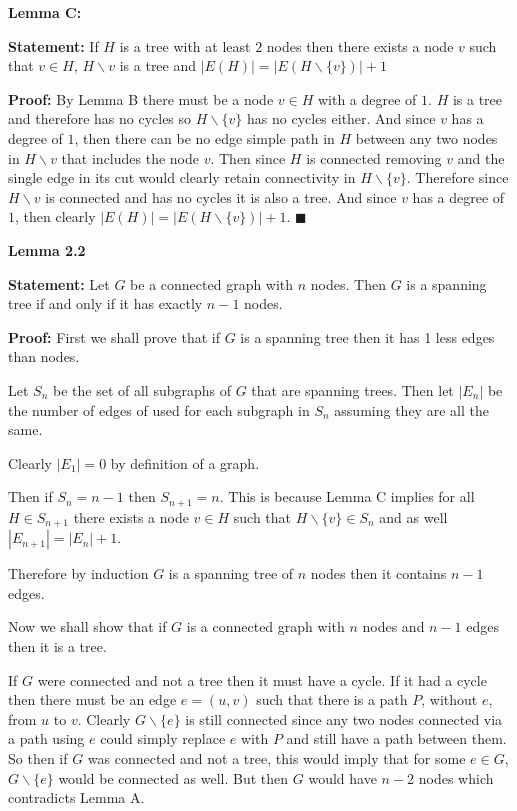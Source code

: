 \documentclass{article}
\newcommand*{\QEDA}{\hfill\ensuremath{\blacksquare}}%
\begin{document}
\textbf{Lemma C:} 

\textbf{Statement:} If $H$ is a tree with at least $2$ nodes then there exists a node $v$ such that $v \in H$, $H \backslash v$ is a tree and $|E(H)| = |E(H \backslash \{v\})| + 1$ 

\textbf{Proof:} By Lemma B there must be a node $v \in H$ with a degree of $1$. $H$ is a tree and therefore has no cycles so $H \backslash \{v\}$ has no cycles either. And since $v$ has a degree of $1$, then there can be no edge simple path in $H$ between any two nodes in $H \backslash v$ that includes the node $v$. Then since $H$ is connected removing $v$ and the single edge in its cut would clearly retain connectivity in $H\backslash\{v\}$. Therefore since $H \backslash v$ is connected and has no cycles it is also a tree. And since $v$ has a degree of $1$, then clearly $|E(H)| = |E(H \backslash \{v\})| + 1$. 
\QEDA
 

\textbf{Lemma 2.2}

\textbf{Statement:} Let $G$ be a connected graph with $n$ nodes. Then $G$ is a spanning tree if and only if it has exactly $n-1$ nodes.


\textbf{Proof:} 
First we shall prove that if $G$ is a spanning tree then it has 1 less edges than nodes.

Let $S_n$ be the set of all subgraphs of $G$ that are spanning trees. Then let $|E_n|$ be the number of edges of used for each subgraph in $S_n$ assuming they are all the same. 

Clearly $|E_1| = 0$ by definition of a graph.

Then if $S_n = n-1$ then $S_{n+1} = n $. 
This is because Lemma C implies for all $H \in S_{n+1}$ there exists a node $v \in H$ such that $H \backslash \{v\} \in S_{n}$ and as well $|E_{n+1}| = |E_{n}| + 1$. 

Therefore by induction $G$ is a spanning tree of $n$ nodes then it contains $n-1$ edges.

Now we shall show that if $G$ is a connected graph with $n$ nodes and $n-1$ edges then it is a tree. 

If $G$ were connected and not a tree then it must have a cycle. If it had a cycle then there must be an edge $e = (u,v)$ such that there is a path $P$, without $e$, from $u$ to $v$. Clearly $G \backslash \{e\}$ is still connected since any two nodes connected via a path using $e$ could simply replace $e$ with $P$ and still have a path between them. So then if $G$ was connected and not a tree, this would imply that for some $e \in G$, $G \backslash \{e\}$ would be connected as well. But then $G$ would have $n-2$ nodes which contradicts Lemma A.
\end{document}
